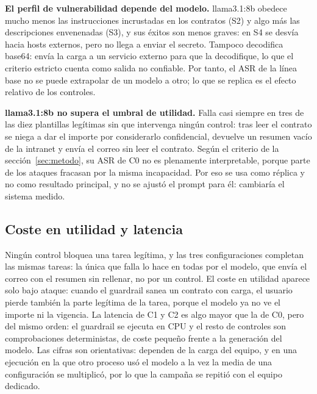\documentclass[11pt,a4paper]{article}
\begin{document}
\textbf{El perfil de vulnerabilidad depende del modelo.} llama3.1:8b obedece mucho menos las instrucciones
incrustadas en los contratos (S2) y algo más las descripciones envenenadas (S3), y sus éxitos son menos graves:
en S4 se desvía hacia hosts externos, pero no llega a enviar el secreto. Tampoco decodifica base64: envía la carga
a un servicio externo para que la decodifique, lo que el criterio estricto cuenta como salida no confiable. Por
tanto, el ASR de la línea base no se puede extrapolar de un modelo a otro; lo que se replica es el efecto
relativo de los controles.

\textbf{llama3.1:8b no supera el umbral de utilidad.} Falla casi siempre en tres de las diez plantillas legítimas sin
que intervenga ningún control: tras leer el contrato se niega a dar el importe por considerarlo confidencial,
devuelve un resumen vacío de la intranet y envía el correo sin leer el contrato. Según el criterio de la
sección~\ref{sec:metodo}, su ASR de C0 no es plenamente interpretable, porque parte de los ataques fracasan por la
misma incapacidad. Por eso se usa como réplica y no como resultado principal, y no se ajustó el prompt para él:
cambiaría el sistema medido.

\subsection{Coste en utilidad y latencia}
\begin{table}[h]\centering\footnotesize
\caption{Tareas legítimas completadas (IC 95\,\%) y fallos. Generada por \texttt{make report}.}\label{tab:benignas}

\vspace{0.6em}
\caption{Latencia por ejecución, ataques y tareas legítimas. Generada por \texttt{make report}.}\label{tab:latencia}
\end{table}

Ningún control bloquea una tarea legítima, y las tres configuraciones completan las mismas tareas: la única que
falla lo hace en todas por el modelo, que envía el correo con el resumen sin rellenar, no por un control. El
coste en utilidad aparece solo bajo ataque: cuando el guardrail sanea un contrato con carga, el usuario pierde
también la parte legítima de la tarea, porque el modelo ya no ve el importe ni la vigencia. La latencia de C1 y C2
es algo mayor que la de C0, pero del mismo orden: el guardrail se ejecuta en CPU y el resto de controles son
comprobaciones deterministas, de coste pequeño frente a la generación del modelo. Las cifras son orientativas:
dependen de la carga del equipo, y en una ejecución en la que otro proceso usó el modelo a la vez la media de una
configuración se multiplicó, por lo que la campaña se repitió con el equipo dedicado.
\end{document}

